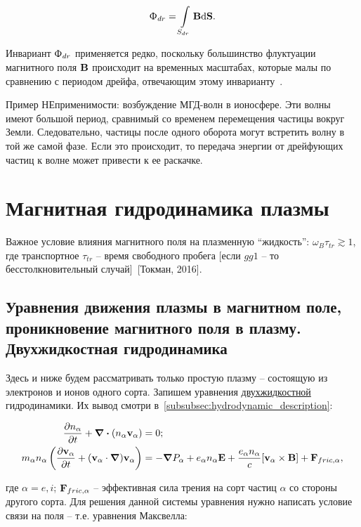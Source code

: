 \documentclass[10pt, a4paper]{article}
\newcommand{\Tokman}{~[Токман, 2016]}
\let\stdsection\section
\renewcommand\section{\newpage\stdsection}
\begin{document}
\begin{equation*}
     \Upphi_{dr}= \int\limits_{S_{dr}} \vb{B}\dd\vb{S}.
\end{equation*}

Инвариант $\Upphi_{dr}$ применяется редко, поскольку большинство флуктуации магнитного поля $\vb{B}$ происходит на временных масштабах, которые малы по сравнению с периодом дрейфа, отвечающим этому инварианту~\cite{chen}.

Пример НЕприменимости: возбуждение МГД-волн в ионосфере. Эти волны имеют большой период, сравнимый со временем перемещения частицы вокруг Земли. Следовательно, частицы после одного оборота могут встретить волну в той же самой фазе. Если это происходит, то передача энергии от дрейфующих частиц к волне может привести к ее раскачке.

\section{Магнитная гидродинамика плазмы}

Важное условие влияния магнитного поля на плазменную ``жидкость'': $\omega_B\tau_{tr}\gtrsim 1$, где транспортное $\tau_{tr}$ -- время свободного пробега [если $gg 1$ -- то бесстолкновительный случай]\Tokman.

\subsection{Уравнения движения плазмы в магнитном поле, проникновение магнитного поля в плазму. Двухжидкостная гидродинамика}

Здесь и ниже будем рассматривать только простую плазму -- состоящую из электронов и ионов одного сорта. Запишем уравнения \uline{двухжидкостной} гидродинамики. Их вывод смотри в~\ref{subsubsec:hydrodynamic_description}:

\begin{align*}
	\pdv{n_\alpha}{t}+\div{ \left( n_\alpha \vb{v}_\alpha \right) } &= 0;\\
	m_\alpha n_\alpha \left( \pdv{\vb{v}_\alpha}{t} +(\vb{v}_\alpha \cdot\grad )\vb{v}_\alpha \right) &= -\grad{P_\alpha} + e_\alpha n_\alpha\vb{E} + \frac{e_\alpha n_\alpha}{c}[\vb{v}_\alpha \times \vb{B}] + \vb{F}_{fric,\alpha},
\end{align*}

где $\alpha = e, i$; $\vb{F}_{fric,\alpha}$ -- эффективная сила трения на сорт частиц $\alpha$ со стороны другого сорта. Для решения данной системы уравнения нужно написать условие связи на поля -- т.е. уравнения Максвелла:
\end{document}
